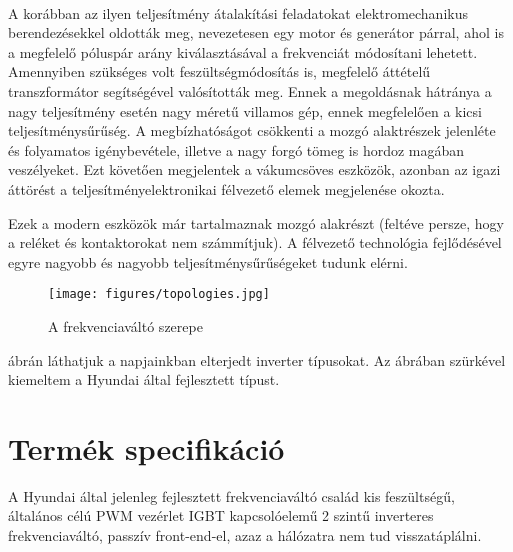 \paragraph{}
A korábban az ilyen teljesítmény átalakítási feladatokat elektromechanikus berendezésekkel oldották meg, nevezetesen egy motor és generátor párral, ahol is a megfelelő póluspár arány kiválasztásával a frekvenciát módosítani lehetett. Amennyiben szükséges volt feszültségmódosítás is, megfelelő áttételű transzformátor segítségével valósították meg. Ennek a megoldásnak hátránya a nagy teljesítmény esetén nagy méretű villamos gép, ennek megfelelően a kicsi teljesítménysűrűség. A megbízhatóságot csökkenti a mozgó alaktrészek jelenléte és folyamatos igénybevétele, illetve a nagy forgó tömeg is hordoz magában veszélyeket. Ezt követően megjelentek a vákumcsöves eszközök, azonban az igazi áttörést a teljesítményelektronikai félvezető elemek megjelenése okozta.

Ezek a modern eszközök már tartalmaznak mozgó alakrészt (feltéve persze, hogy a reléket és kontaktorokat nem számmítjuk). A félvezető technológia fejlődésével egyre nagyobb és nagyobb teljesítménysűrűségeket tudunk elérni.

\begin{figure}[!h]
	\centering
	\texttt{[image: figures/topologies.jpg]}
	\caption{A frekvenciaváltó szerepe} 
	\label{fig:topologies}
\end{figure}

 ábrán láthatjuk a napjainkban elterjedt inverter típusokat. Az ábrában szürkével kiemeltem a Hyundai által fejlesztett típust.

\section{Termék specifikáció}

A Hyundai által jelenleg fejlesztett frekvenciaváltó család kis feszültségű, általános célú PWM vezérlet IGBT kapcsolóelemű 2 szintű inverteres frekvenciaváltó, passzív front-end-el, azaz a hálózatra nem tud visszatáplálni.


